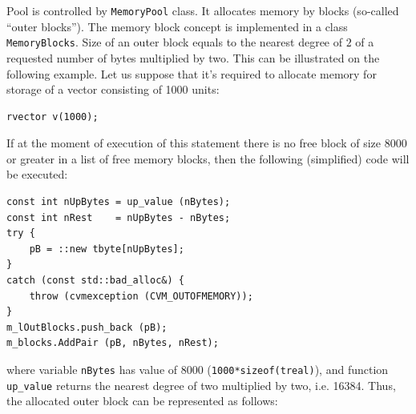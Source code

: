 Pool is controlled by \verb"MemoryPool" class. It allocates memory
by blocks (so-called ``outer blocks'').
The memory block concept is implemented in a class
\verb"MemoryBlocks". Size of an outer block equals to the nearest
degree of $2$ of a requested number of bytes multiplied by two. This
can be illustrated on the following example. Let us suppose that it's
required to allocate memory for storage of a vector consisting
of 1000 units:
\begin{Verbatim}
rvector v(1000);
\end{Verbatim}
If at the moment of execution of this statement there is no free
block of size 8000 or greater in a list of free memory blocks, then
the following (simplified) code will be executed:
\begin{Verbatim}
const int nUpBytes = up_value (nBytes);
const int nRest    = nUpBytes - nBytes;
try {
    pB = ::new tbyte[nUpBytes];
}
catch (const std::bad_alloc&) {
    throw (cvmexception (CVM_OUTOFMEMORY));
}
m_lOutBlocks.push_back (pB);
m_blocks.AddPair (pB, nBytes, nRest);
\end{Verbatim}
where variable \verb"nBytes" has value of 8000
(\verb"1000*sizeof(treal)"), and function \verb"up_value" returns
the nearest degree of two multiplied by two, i.e. 16384. Thus, the
allocated outer block can be represented as follows:

